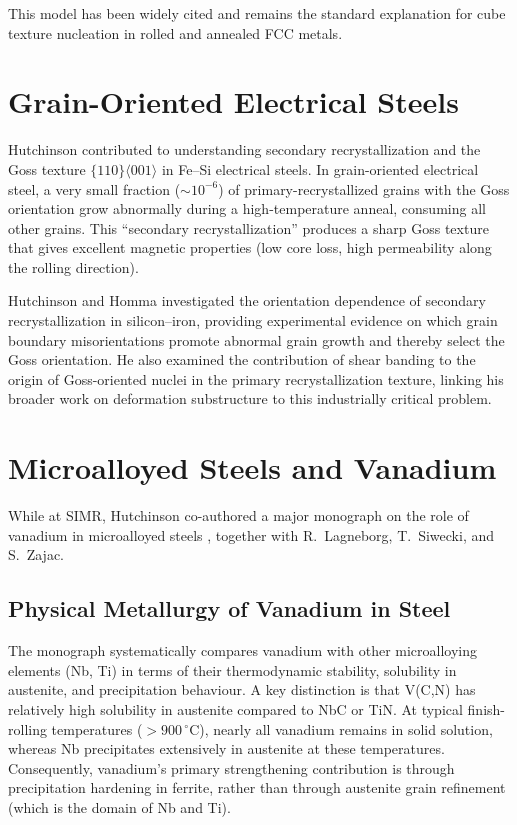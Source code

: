 \documentclass[11pt,a4paper]{article}
\begin{document}
This model has been widely cited and remains the standard explanation for
cube texture nucleation in rolled and annealed FCC metals.

\section{Grain-Oriented Electrical Steels}
\label{sec:goss}

Hutchinson contributed to understanding secondary recrystallization and
the Goss texture $\{110\}\langle 001\rangle$ in Fe--Si electrical steels.
In grain-oriented electrical steel, a very small fraction
($\sim\!10^{-6}$) of primary-recrystallized grains with the Goss
orientation grow abnormally during a high-temperature anneal, consuming
all other grains.  This ``secondary recrystallization'' produces a sharp
Goss texture that gives excellent magnetic properties (low core loss,
high permeability along the rolling direction).

Hutchinson and Homma \cite{Homma2003} investigated the orientation
dependence of secondary recrystallization in silicon--iron, providing
experimental evidence on which grain boundary misorientations promote
abnormal grain growth and thereby select the Goss orientation.  He also
examined the contribution of shear banding to the origin of Goss-oriented
nuclei in the primary recrystallization texture, linking his broader
work on deformation substructure to this industrially critical problem.

\section{Microalloyed Steels and Vanadium}
\label{sec:microalloy}

While at SIMR, Hutchinson co-authored a major monograph on the role of
vanadium in microalloyed steels \cite{Lagneborg2014}, together with
R.~Lagneborg, T.~Siwecki, and S.~Zajac.

\subsection{Physical Metallurgy of Vanadium in Steel}

The monograph systematically compares vanadium with other microalloying
elements (Nb, Ti) in terms of their thermodynamic stability, solubility
in austenite, and precipitation behaviour.  A key distinction is that
V(C,N) has relatively high solubility in austenite compared to
NbC or TiN.  At typical finish-rolling temperatures ($>900\,{}^\circ$C),
nearly all vanadium remains in solid solution, whereas Nb precipitates
extensively in austenite at these temperatures.  Consequently, vanadium's
primary strengthening contribution is through precipitation hardening in
ferrite, rather than through austenite grain refinement (which is the
domain of Nb and Ti).
\end{document}

